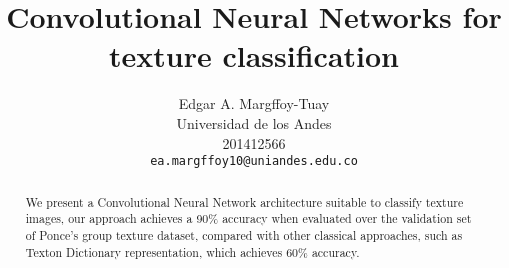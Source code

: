 \documentclass[10pt,twocolumn,letterpaper]{article}
\begin{document}
\title{Convolutional Neural Networks for texture classification}

\author{Edgar A. Margffoy-Tuay\\
Universidad de los Andes\\
201412566\\
{\tt\small ea.margffoy10@uniandes.edu.co}
}

\maketitle

\begin{abstract}
We present a Convolutional Neural Network architecture suitable to classify texture images, our approach achieves a 90\% accuracy when evaluated over the validation set of Ponce's group texture dataset, compared with other classical approaches, such as Texton Dictionary representation, which achieves 60\% accuracy.
\end{abstract}


\end{document}
